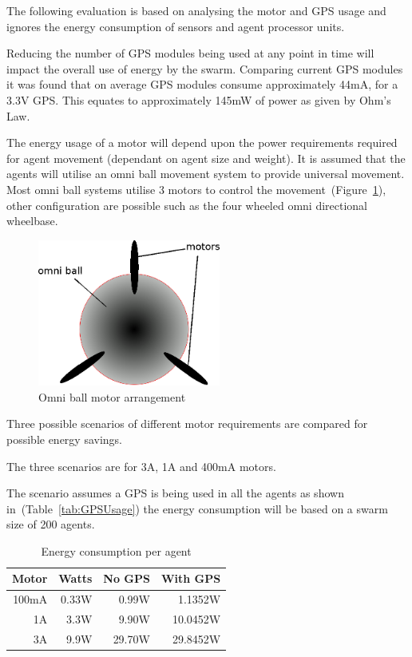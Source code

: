 The following evaluation is based on analysing the motor and GPS usage and ignores the energy consumption of sensors and agent processor units.

Reducing the number of GPS modules being used at any point in time will impact the overall use of energy by the swarm. Comparing current GPS modules it was found that on average GPS modules consume approximately 44mA, for a 3.3V GPS. This equates to approximately 145mW of power as given by Ohm's Law. 


The energy usage of a motor will depend upon the power requirements required for agent movement (dependant on agent size and weight). It is assumed that the agents will utilise an omni ball movement system to provide universal movement. Most omni ball systems utilise 3 motors to control the movement~(Figure~\ref{fig:OmniBall}), other configuration are possible such as the four wheeled omni directional wheelbase\cite{PD:06}.

\begin{figure}[H]
\begin{center}
\includegraphics[width=6cm]{CHAPTER-6/figures/OmniBall}
\end{center}
\caption{Omni ball motor arrangement \label{fig:OmniBall}}
\end{figure}

Three possible scenarios of different motor requirements are compared for possible energy savings.

The three scenarios are for 3A, 1A and 400mA motors.

The scenario assumes a GPS is being used in all the agents as shown in~(Table~\ref{tab:GPSUsage}) the energy consumption will be based on a swarm size of 200 agents.

\begin{table}[H]
\begin{center}
\begin{tabular}{| r | r | r | r |}
\hline
Motor & Watts  & No GPS & With GPS \\ \hline
100mA &  0.33W &  0.99W & 1.1352W\\ \hline
1A    &  3.3W  &  9.90W & 10.0452W\\ \hline
3A    &  9.9W  & 29.70W & 29.8452W\\ \hline
\end{tabular}\caption{Energy consumption per agent} \label{tab:Energy1}
\end{center}
\end{table}

